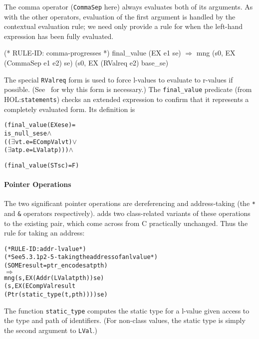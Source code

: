 \documentclass[11pt]{article}
\newcommand{\HOLfile}[1]{HOL:\texttt{#1}}
\begin{document}
\medskip
\noindent
{}%
The comma operator (\texttt{CommaSep} here) always evaluates both of
its arguments.  As with the other operators, evaluation of the first
argument is handled by the contextual evaluation rule; we need only
provide a rule for when the left-hand expression has been fully
evaluated.
\begin{stdrule}
(* RULE-ID: comma-progresses *)
     final_value (EX e1 se)
   \(\Rightarrow\)
     mng (s0, EX (CommaSep e1 e2) se)
         (s0, EX (RValreq e2) base_se)
\end{stdrule}
%
%
The special \texttt{RValreq} form is used to force l-values to
evaluate to r-values if possible.  (See~\cite[\S3.3.3]{Norrish98} for
why this form is necessary.)
%
The \texttt{final_value} predicate (from \HOLfile{statements}) checks
an extended expression to confirm that it represents a completely
evaluated form.  Its definition is
\begin{center}
\begin{minipage}{\textwidth}
\begin{alltt}
   (final_value (EX e se) =
      is_null_se se \(\land\)
      ((\(\exists\)v t. e = ECompVal v t) \(\lor\)
       (\(\exists\)a t p. e = LVal a t p))) \(\land\)

   (final_value (ST s c) = F)
\end{alltt}
\end{minipage}
\end{center}

\paragraph{Pointer Operations}
The two significant pointer operations are dereferencing and
address-taking (the \texttt{*} and \texttt{\&} operators
respectively).  \cpp{} adds two class-related variants of these
operations to the existing pair, which come across from C practically
unchanged.  Thus the rule for taking an address:
%
\begin{alltt}
(* RULE-ID: addr-lvalue *)
(* See 5.3.1 p2-5 - taking the address of an lvalue *)
     (SOME result = ptr_encode s a t pth)
   \(\Rightarrow\)
     mng (s, EX (Addr (LVal a t pth)) se)
         (s, EX (ECompVal result
                          (Ptr (static_type (t,pth)))) se)

\end{alltt}
%
The function
\texttt{static_type} computes
the static type for a l-value given access to the type and path of
identifiers.  (For non-class values, the static type is simply the
second argument to \texttt{LVal}.)
\end{document}
